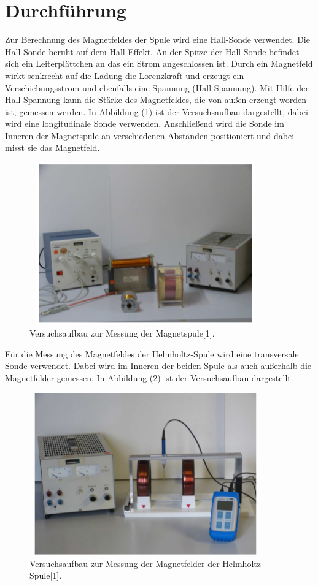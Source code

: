 \section{Durchführung}
Zur Berechnung des Magnetfeldes der Spule wird eine Hall-Sonde verwendet.
Die Hall-Sonde beruht auf dem Hall-Effekt. An der Spitze der Hall-Sonde befindet sich
ein Leiterplättchen an das ein Strom angeschlossen ist. Durch ein Magnetfeld wirkt senkrecht
auf die Ladung die Lorenzkraft und erzeugt ein Verschiebungsstrom und ebenfalls eine Spannung (Hall-Spannung).
Mit Hilfe der Hall-Spannung kann die Stärke des Magnetfeldes, die von außen erzeugt worden ist, gemessen werden.
In Abbildung (\ref{abb:4}) ist der Versuchsaufbau dargestellt, dabei wird eine longitudinale Sonde verwenden.
Anschließend  wird die Sonde im Inneren der Magnetspule an verschiedenen Abständen positioniert und dabei misst sie das
Magnetfeld.
\begin{figure}[H]
  \centering
  \includegraphics[width=10cm, height= 7cm]{Abb4.png}
  \caption{Versuchsaufbau zur Messung der Magnetspule[1].}
  \label{abb:4}
\end{figure}
Für die Messung des Magnetfeldes der Helmholtz-Spule wird eine transversale Sonde verwendet.
Dabei wird im Inneren der beiden Spule als auch außerhalb die Magnetfelder gemessen.
In Abbildung (\ref{abb:5}) ist der Versuchsaufbau dargestellt.
\begin{figure}[H]
  \centering
  \includegraphics[width=10cm, height= 7cm]{Abb5.png}
  \caption{Versuchsaufbau zur Messung der Magnetfelder der Helmholtz-Spule[1].}
  \label{abb:5}
\end{figure}
